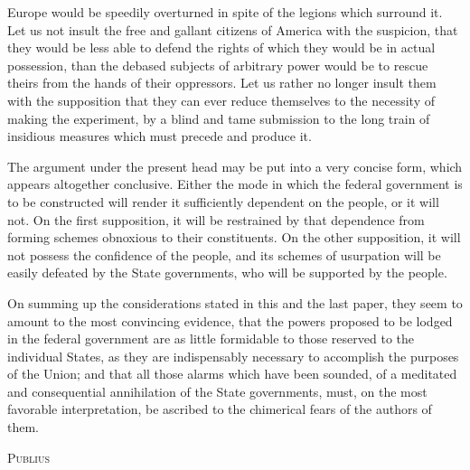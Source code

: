 Europe would be speedily overturned in spite of the legions which surround it. Let us not insult the free and gallant citizens of America with the suspicion, that they would be less able to defend the rights of which they would be in actual possession, than the debased subjects of arbitrary power would be to rescue theirs from the hands of their oppressors. Let us rather no longer insult them with the supposition that they can ever reduce themselves to the necessity of making the experiment, by a blind and tame submission to the long train of insidious measures which must precede and produce it.

The argument under the present head may be put into a very concise form, which appears altogether conclusive. Either the mode in which the federal government is to be constructed will render it sufficiently dependent on the people, or it will not. On the first supposition, it will be restrained by that dependence from forming schemes obnoxious to their constituents. On the other supposition, it will not possess the confidence of the people, and its schemes of usurpation will be easily defeated by the State governments, who will be supported by the people.

On summing up the considerations stated in this and the last paper, they seem to amount to the most convincing evidence, that the powers proposed to be lodged in the federal government are as little formidable to those reserved to the individual States, as they are indispensably necessary to accomplish the purposes of the Union; and that all those alarms which have been sounded, of a meditated and consequential annihilation of the State governments, must, on the most favorable interpretation, be ascribed to the chimerical fears of the authors of them.

\vspace{.5cm}
\textsc{Publius}

